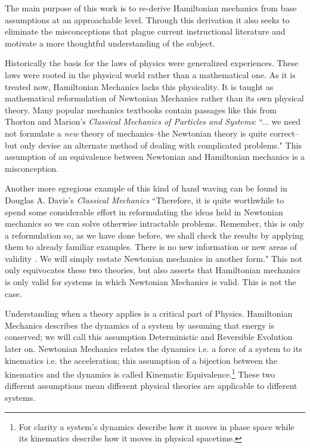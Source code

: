 \documentclass{article}[a4paper]
\begin{document}
	The main purpose of this work is to re-derive Hamiltonian mechanics from base assumptions at an approachable level. Through this derivation it also seeks to eliminate the misconceptions that plague current instructional literature and motivate a more thoughtful understanding of the subject.
	
	 Historically the basis for the laws of physics were generalized experiences. These laws were rooted in the physical world rather than a mathematical one. As it is treated now, Hamiltonian Mechanics lacks this physicality. It is taught as mathematical reformulation of Newtonian Mechanics rather than its own physical theory. Many popular mechanics textbooks contain passages like this from Thorton and Marion's \textit{Classical Mechanics of Particles and Systems}: ``... we need not formulate a \textit{new} theory of mechanics--the Newtonian theory is quite correct--but only devise an alternate method of dealing with complicated problems."\cite{thornton_marion_2014} This assumption of an equivalence between Newtonian and Hamiltonian mechanics is a misconception.
	
	Another more egregious example of this kind of hand waving can be found in Douglas A. Davis's \textit{Classical Mechanics} ``Therefore, it is quite worthwhile to spend some considerable effort in reformulating the ideas held in Newtonian mechanics so we can solve otherwise intractable problems. Remember, this is only a reformulation so, as we have done before, we shall check the results by applying them to already familiar examples. There is no new information or new areas of validity . We will simply restate Newtonian mechanics in another form."\cite{davis_2012} This not only equivocates these two theories, but also asserts that Hamiltonian mechanics is only valid for systems in which Newtonian Mechanics is valid. This is not the case.
	
	Understanding when a theory applies is a critical part of Physics. Hamiltonian Mechanics describes the dynamics of a system by assuming that energy is conserved; we will call this assumption Deterministic and Reversible Evolution later on. Newtonian Mechanics relates the dynamics i.e. a force of a system to its kinematics i.e. the acceleration; this assumption of a bijection between the kinematics and the dynamics is called Kinematic Equivalence.\footnote{For clarity a system's dynamics describe how it moves in phase space while its kinematics describe how it moves in physical spacetime.} These two different assumptions mean different physical theories are applicable to different systems.
	
\end{document}

